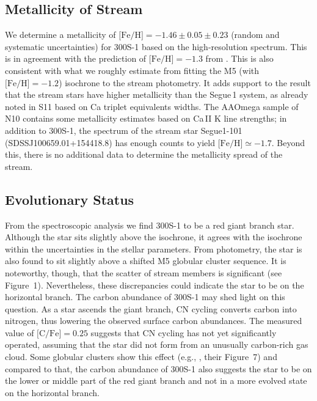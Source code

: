 \documentclass{emulateapj}
\begin{document}
\subsection{Metallicity of Stream}
We determine a metallicity of $\mbox{[Fe/H]} = -1.46 \pm 0.05 \pm 0.23
$ (random and systematic uncertainties) for 300S-1 based on the
high-resolution spectrum. This is in agreement with the prediction of
$\mbox{[Fe/H]} = -1.3$ from \citet{Simon2011}. This is also consistent
with what we roughly estimate from fitting the M5 (with
$\mbox{[Fe/H]}=-1.2$) isochrone to the stream photometry.  It adds
support to the result that the stream stars have higher metallicity
than the Segue\,1 system, as already noted in S11 based on Ca triplet
equivalents widths. The AAOmega sample of N10 contains some
metallicity estimates based on Ca\,II K line strengths; in addition to
300S-1, the spectrum of the stream star Segue1-101
(SDSSJ100659.01+154418.8) has enough counts to yield $\mbox{[Fe/H]}
\simeq -1.7$. Beyond this, there is no additional data to determine
the metallicity spread of the stream.


\subsection{Evolutionary Status}

From the spectroscopic analysis we find 300S-1 to be a red giant
branch star. Although the star sits slightly above the isochrone, it
agrees with the isochrone within the uncertainties in the stellar
parameters.  From photometry, the star is also found to sit slightly
above a shifted M5 globular cluster sequence. It is noteworthy,
though, that the scatter of stream members is significant (see
Figure~1). Nevertheless, these discrepancies could indicate the star
to be on the horizontal branch. The carbon abundance of 300S-1 may
shed light on this question. As a star ascends the giant branch, CN
cycling converts carbon into nitrogen, thus lowering the observed
surface carbon abundances. The measured value of $\mbox{[C/Fe]}=0.25$
suggests that CN cycling has not yet significantly operated, assuming
that the star did not form from an unusually carbon-rich gas
cloud. Some globular clusters show this effect (e.g.,
\citealt{carretta05}, their Figure~7) and compared to that, the carbon
abundance of 300S-1 also suggests the star to be on the lower or
middle part of the red giant branch and not in a more evolved state on
the horizontal branch.
\end{document}
